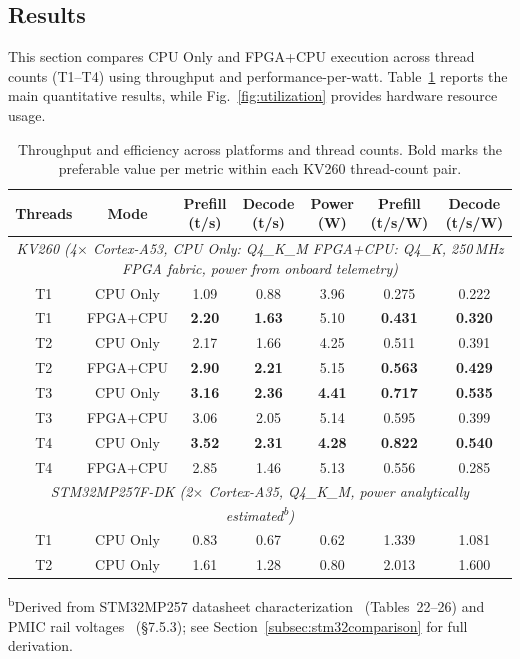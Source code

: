 \documentclass[manuscript,]{acmart} %
\begin{document}
\subsection{Results}

This section compares CPU Only and FPGA+CPU execution across thread counts (T1--T4) using throughput and performance-per-watt. Table~\ref{tab:short_results} reports the main quantitative results, while Fig.~\ref{fig:utilization} provides hardware resource usage.

\begin{table}[htbp]
\centering
\scriptsize
\caption{Throughput and efficiency across platforms and thread counts.
Bold marks the preferable value per metric within each KV260 thread-count pair.}
\label{tab:short_results}
\setlength{\tabcolsep}{3pt}
\begin{tabular}{c c c c c c c}
\hline
Threads & Mode & Prefill (t/s) & Decode (t/s) & Power (W) & Prefill (t/s/W) & Decode (t/s/W) \\
\hline
\multicolumn{7}{c}{\itshape {KV260 (4$\times$ Cortex-A53, CPU Only: Q4\_K\_M \textbar{} FPGA+CPU: Q4\_K, 250\,MHz FPGA fabric, power from onboard telemetry)}} \\
\hline
T1 & CPU Only & 1.09 & 0.88 & 3.96 & 0.275 & 0.222 \\
T1 & FPGA+CPU & \textbf{2.20} & \textbf{1.63} & 5.10 & \textbf{0.431} & \textbf{0.320} \\
\hline
T2 & CPU Only & 2.17 & 1.66 & 4.25 & 0.511 & 0.391 \\
T2 & FPGA+CPU & \textbf{2.90} & \textbf{2.21} & 5.15 & \textbf{0.563} & \textbf{0.429} \\
\hline
T3 & CPU Only & \textbf{3.16} & \textbf{2.36} & \textbf{4.41} & \textbf{0.717} & \textbf{0.535} \\
T3 & FPGA+CPU & 3.06 & 2.05 & 5.14 & 0.595 & 0.399 \\
\hline
T4 & CPU Only & \textbf{3.52} & \textbf{2.31} & \textbf{4.28} & \textbf{0.822} & \textbf{0.540} \\
T4 & FPGA+CPU & 2.85 & 1.46 & 5.13 & 0.556 & 0.285 \\
\hline
\multicolumn{7}{c}{\textit{STM32MP257F-DK (2$\times$ Cortex-A35, Q4\_K\_M, power analytically estimated\textsuperscript{b})}} \\
\hline
T1 & CPU Only & 0.83 & 0.67 & 0.62 & 1.339 & 1.081 \\
T2 & CPU Only & 1.61 & 1.28 & 0.80 & 2.013 & 1.600 \\
\hline
\end{tabular}

\par\vspace{4pt}
{\footnotesize

\textsuperscript{b}Derived from STM32MP257 datasheet characterization~\cite{ds14284} (Tables~22--26) and PMIC rail voltages~\cite{um3385} (\S7.5.3); see Section~\ref{subsec:stm32comparison} for full derivation.
}

\end{table}
\end{document}
